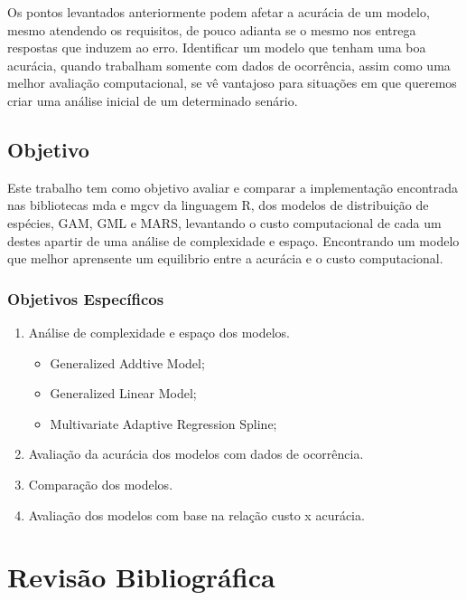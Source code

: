 \documentclass[
	12pt,				%
	openright,			%
	oneside,			%
	a4paper,			%
	english,			%
	brazil				%
	]{abntex2}
\begin{document}
Os pontos levantados anteriormente podem afetar a acurácia de um modelo, mesmo atendendo os requisitos, 
de pouco adianta se o mesmo nos entrega respostas que induzem ao erro. Identificar um modelo que tenham uma boa acurácia, 
quando trabalham somente com dados de ocorrência, assim como uma melhor avaliação computacional, se vê vantajoso para 
situações em que queremos criar uma análise inicial de um determinado senário.

\section{Objetivo}

Este trabalho tem como objetivo avaliar e comparar a implementação encontrada nas bibliotecas mda e mgcv da linguagem R, dos modelos
de distribuição de espécies, GAM, GML e MARS, levantando o custo computacional de cada um destes apartir de uma análise de 
complexidade e espaço. Encontrando um modelo que melhor aprensente um equilibrio entre a acurácia e o custo computacional.

\subsection{Objetivos Específicos}

\begin{enumerate}
	\item Análise de complexidade e espaço dos modelos.
	\begin{itemize}
		\item Generalized Addtive Model;
		\item Generalized Linear Model;
		\item Multivariate Adaptive Regression Spline;
	\end{itemize}
	\item Avaliação da acurácia dos modelos com dados de ocorrência.
	\item Comparação dos modelos.
	\item Avaliação dos modelos com base na relação custo x acurácia.
\end{enumerate}


\chapter{Revisão Bibliográfica}
\end{document}
